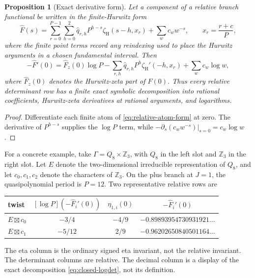 \documentclass[11pt]{article}
\newtheorem{proposition}[theorem]{Proposition}
\theoremstyle{definition}
\newcommand{\Z}{\mathbb Z}
\newcommand{\zH}{\zeta_{\mathrm H}}
\begin{document}
\begin{proposition}[Exact derivative form]
\label{prop:closed-logdet}
Let a component of a relative branch functional be written in the
finite-Hurwitz form
\begin{equation}
 \widehat F(s)=
 \sum_{r=0}^{P-1}\sum_{h=0}^{2}
 \widehat q_{r,h}P^{h-s}
 \zH\!\left(s-h,x_r\right)
 +\sum_w c_w w^{-s},
 \qquad x_r=\frac{r+c}{P},
 \label{eq:relative-atom-form}
\end{equation}
where the finite point terms record any reindexing used to place the
Hurwitz arguments in a chosen fundamental interval.  Then
\begin{equation}
 -\widehat F'(0)
 =\widehat F_z(0)\log P
  -\sum_{r,h}\widehat q_{r,h}P^h
       \zH'(-h,x_r)
  +\sum_w c_w\log w,
 \label{eq:closed-logdet}
\end{equation}
where $\widehat F_z(0)$ denotes the Hurwitz-zeta part of
$\widehat F(0)$.  Thus every relative determinant row has a finite
exact symbolic decomposition into rational coefficients,
Hurwitz-zeta derivatives at rational arguments, and logarithms.
\end{proposition}

\begin{proof}
Differentiate each finite atom of
\eqref{eq:relative-atom-form} at zero.  The derivative of
$P^{h-s}$ supplies the $\log P$ term, while
$-\partial_s(c_ww^{-s})|_{s=0}=c_w\log w$.
\end{proof}

For a concrete example, take $\Gamma=Q_8\times\Z_3$, with $Q_8$ in the
left slot and $\Z_3$ in the right slot.  Let $E$ denote the
two-dimensional irreducible representation of $Q_8$, and let
$c_0,c_1,c_2$ denote the characters of $\Z_3$.  On the plus branch at
$J=1$, the quasipolynomial period is $P=12$.  Two representative relative
rows are
\begin{center}
\begin{tabular}{lccc}
\toprule
twist & $[\log P](-\widehat F_i'(0))$ & $\eta_{1,i}(0)$ & $-\widehat F_i'(0)$ \\
\midrule
$E\boxtimes c_0$ & $-3/4$ & $-4/9$ & $-0.89893954730931921\ldots$ \\
$E\boxtimes c_1$ & $-5/12$ & $2/9$ & $-0.96202650840501164\ldots$ \\
\bottomrule
\end{tabular}
\end{center}
The eta column is the ordinary signed eta invariant, not the relative
invariant.  The determinant columns are relative.  The decimal column is a display of the exact decomposition
\eqref{eq:closed-logdet}, not its definition.
\end{document}
